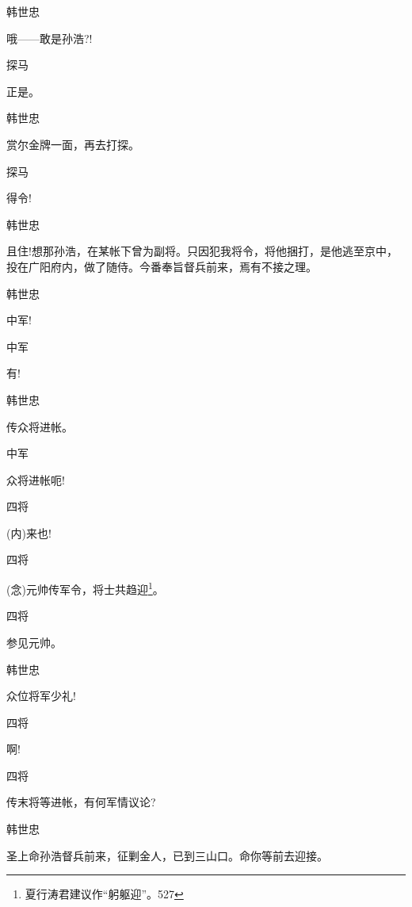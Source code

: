 {韩世忠\hspace{20pt}~

哦------敢是孙浩?!

探马\hspace{30pt}~

正是。

韩世忠\hspace{20pt}~

赏尔金牌一面，再去打探。

探马\hspace{30pt}~

得令!

韩世忠

且住!想那孙浩，在某帐下曾为副将。只因犯我将令，将他捆打，是他逃至京中，投在{广阳}府内，做了随侍。今番奉旨督兵前来，焉有不接之理。

韩世忠\hspace{20pt}~

中军!

中军\hspace{30pt}~

有!

韩世忠\hspace{20pt}~

传众将进帐。

中军\hspace{30pt}~

众将进帐呃!

{四将}\hspace{30pt}~

({\akai 内})来也!

{四将}

({\akai 念})元帅传军令，将士共趋迎\footnote{ 夏行涛君建议作``躬躯迎''。{527}}。

{四将}\hspace{30pt}~

参见元帅。

韩世忠\hspace{20pt}~

众位将军少礼!

{四将}\hspace{30pt}~

啊!

{四将}\hspace{30pt}~

传末将等进帐，有何军情议论?

韩世忠\hspace{20pt}~

圣上命孙浩督兵前来，征剿金人，已到三山口。命你等前去迎接。

}
